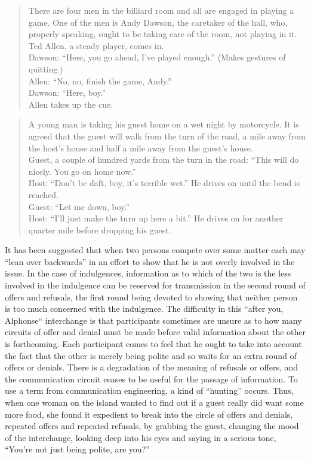 \documentclass[openany,nobib]{tufte-book}
\begin{document}
\begin{quote}
There are four men in the billiard room and all are engaged in playing a
game. One of the men is Andy Dawson, the caretaker of the hall, who,
properly speaking, ought to be taking care of the room, not playing in
it. Ted Allen, a steady player, comes in.\\
Dawson: ``Here, you go ahead, I've played enough.'' (Makes gestures of
quitting.)\\
Allen: ``No, no, finish the game, Andy.''\\
Dawson: ``Here, boy.''\\
Allen takes up the cue.
\end{quote}

\begin{quote}
A young man is taking his guest home on a wet night by motorcycle. It is
agreed that the guest will walk from the turn of the road, a mile away
from the host's house and half a mile away from the guest's house.\\
Guest, a couple of hundred yards from the turn in the road: ``This will
do nicely. You go on home now.''\\
Host: ``Don't be daft, boy, it's terrible wet.'' He drives on until the
bend is reached.\\
Guest: ``Let me down, boy.''\\
Host: ``I'll just make the turn up here a bit.'' He drives on for
another quarter mile before dropping his guest.
\end{quote}

It has been suggested that when two persons compete over some matter
each may ``lean over backwards'' in an effort to show that he is not
overly involved in the issue. In the case of indulgences, information as
to which of the two is the less involved in the indulgence can be
reserved for transmission in the second round of offers and refusals,
the first round being devoted to showing that neither person is too much
concerned with the indulgence. The difficulty in this ``after you,
Alphonse`` interchange is that participants sometimes are unsure as to
how many circuits of offer and denial must be made before valid
information about the other is forthcoming. Each participant comes to
feel that he ought to take into account the fact that the other is
merely being polite and so waits for an extra round of offers or
denials. There is a degradation of the meaning of refusals or offers,
and the communication circuit ceases to be useful for the passage of
information. To use a term from communication engineering, a kind of
``hunting'' occurs. Thus, when one woman on the island wanted to find
out if a guest really did want some more food, she found it expedient to
break into the circle of offers and denials, repeated offers and
repeated refusals, by grabbing the guest, changing the mood of the
interchange, looking deep into his eyes and saying in a serious tone,
``You're not just being polite, are you?''
\end{document}
